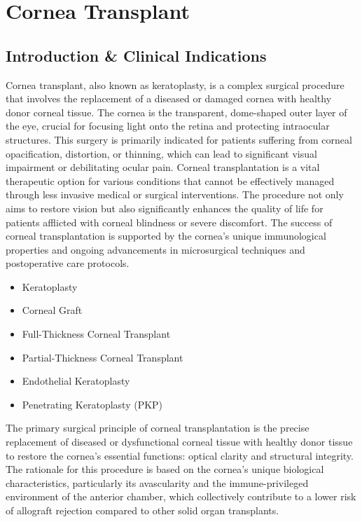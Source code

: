 \chapter{Cornea Transplant}

\section*{Introduction \& Clinical Indications}
Cornea transplant, also known as keratoplasty, is a complex surgical procedure that involves the replacement of a diseased or damaged cornea with healthy donor corneal tissue. The cornea is the transparent, dome-shaped outer layer of the eye, crucial for focusing light onto the retina and protecting intraocular structures. This surgery is primarily indicated for patients suffering from corneal opacification, distortion, or thinning, which can lead to significant visual impairment or debilitating ocular pain. Corneal transplantation is a vital therapeutic option for various conditions that cannot be effectively managed through less invasive medical or surgical interventions. The procedure not only aims to restore vision but also significantly enhances the quality of life for patients afflicted with corneal blindness or severe discomfort. The success of corneal transplantation is supported by the cornea's unique immunological properties and ongoing advancements in microsurgical techniques and postoperative care protocols.

\begin{itemize}
  \item Keratoplasty
  \item Corneal Graft
  \item Full-Thickness Corneal Transplant
  \item Partial-Thickness Corneal Transplant
  \item Endothelial Keratoplasty
  \item Penetrating Keratoplasty (PKP)
\end{itemize}

The primary surgical principle of corneal transplantation is the precise replacement of diseased or dysfunctional corneal tissue with healthy donor tissue to restore the cornea's essential functions: optical clarity and structural integrity. The rationale for this procedure is based on the cornea's unique biological characteristics, particularly its avascularity and the immune-privileged environment of the anterior chamber, which collectively contribute to a lower risk of allograft rejection compared to other solid organ transplants.

